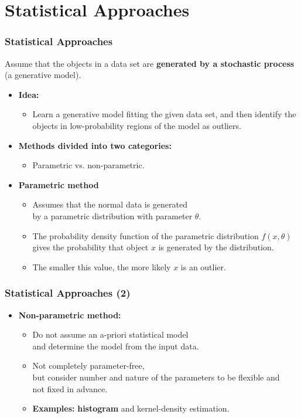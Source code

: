 \section{Statistical Approaches}


\begin{frame}
	\frametitle{Statistical Approaches}
	Assume that the objects in a data set are \textbf{\color{airforceblue}generated by a stochastic process} (a generative model).
	\begin{itemize}
		\item \textbf{Idea:}
		      \begin{itemize}
			      \item Learn a generative model fitting the given data set, and then identify the objects in low-probability regions of the model as outliers.
		      \end{itemize}
		\item \textbf{Methods divided into two categories:}
		      \begin{itemize}
			      \item Parametric vs. non-parametric.
		      \end{itemize}
		\item \textbf{Parametric method}
		      \begin{itemize}
			      \item Assumes that the normal data is generated \\
			            by a parametric distribution with parameter $\theta$.
			      \item The probability density function of the parametric distribution $f(x, \theta)$ \\
			            gives the probability that object $x$ is generated by the distribution.
			      \item The smaller this value, the more likely $x$ is an outlier.
		      \end{itemize}
	\end{itemize}
\end{frame}


\begin{frame}
	\frametitle{Statistical Approaches (2)}
	\begin{itemize}
		\item \textbf{Non-parametric method:}
		      \begin{itemize}
			      \item Do not assume an a-priori statistical model \\
			            and determine the model from the input data.
			      \item Not completely parameter-free, \\
			            but consider number and nature of the parameters to be flexible and \\ not fixed in advance.
			      \item \textbf{Examples:} \textbf{\color{airforceblue}histogram} and kernel-density estimation.
		      \end{itemize}
	\end{itemize}
\end{frame}


